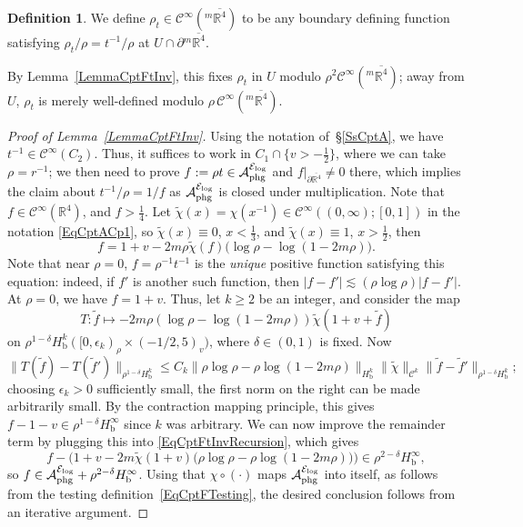 \documentclass[reqno,11pt,letterpaper]{amsart}
\numberwithin{equation}{section}
\numberwithin{figure}{section}
\theoremstyle{definition}
\newtheorem{definition}[thm]{Definition}
\theoremstyle{remark}
\newcommand{\mc}{\mathcal}
\newcommand{\cA}{\mc A}
\newcommand{\cC}{\mc C}
\newcommand{\cE}{\mc E}
\newcommand{\R}{\mathbb{R}}
\newcommand{\eps}{\epsilon}
\newcommand{\ol}{\overline}
\newcommand{\pa}{\partial}
\newcommand{\bop}{{\mathrm{b}}}
\newcommand{\half}{\tfrac{1}{2}}
\newcommand{\CI}{\cC^\infty}
\newcommand{\Hb}{H_{\bop}}
\newcommand{\phg}{{\mathrm{phg}}}
\newcommand{\usref}[1]{{\upshape\ref{#1}}}
\begin{document}
\begin{definition}
\label{DefCptFtInv}
  We define $\rho_t\in\CI({}^m\ol{\R^4})$ to be any boundary defining function satisfying $\rho_t/\rho=t^{-1}/\rho$ at $U\cap\pa{}^m\ol{\R^4}$.
\end{definition}

By Lemma~\ref{LemmaCptFtInv}, this fixes $\rho_t$ in $U$ modulo $\rho^2\CI({}^m\ol{\R^4})$; away from $U$, $\rho_t$ is merely well-defined modulo $\rho\,\CI({}^m\ol{\R^4})$.

\begin{proof}[Proof of Lemma~\usref{LemmaCptFtInv}]
  Using the notation of~\S\ref{SsCptA}, we have $t^{-1}\in\CI(C_2)$. Thus, it suffices to work in $C_1\cap\{v>-\half\}$, where we can take $\rho=r^{-1}$; we then need to prove $f:=\rho t\in\cA_\phg^{\cE_{\rm log}}$ and $f|_{\pa\ol{\R^4}}\neq 0$ there, which implies the claim about $t^{-1}/\rho=1/f$ as $\cA_\phg^{\cE_{\rm log}}$ is closed under multiplication. Note that $f\in\CI(\R^4)$, and $f>\tfrac14$. Let $\tilde\chi(x)=\chi(x^{-1})\in\CI((0,\infty);[0,1])$ in the notation \eqref{EqCptACp1}, so $\tilde\chi(x)\equiv 0$, $x<\tfrac13$, and $\tilde\chi(x)\equiv 1$, $x>\half$, then
  \begin{equation}
  \label{EqCptFtInvRecursion}
    f = 1 + v - 2 m\rho \tilde\chi(f) \bigl(\log\rho-\log(1-2 m\rho)\bigr).
  \end{equation}
  Note that near $\rho=0$, $f=\rho^{-1}t^{-1}$ is the \emph{unique} positive function satisfying this equation: indeed, if $f'$ is another such function, then $|f-f'|\lesssim(\rho\log\rho)|f-f'|$. At $\rho=0$, we have $f=1+v$. Thus, let $k\geq 2$ be an integer, and consider the map
  \[
    T \colon \tilde f \mapsto - 2 m\rho(\log\rho-\log(1-2 m\rho))\tilde\chi(1+v+\tilde f)
  \]
  on $\rho^{1-\delta}\Hb^k([0,\eps_k)_\rho\times(-1/2,5)_v)$, where $\delta\in(0,1)$ is fixed. Now
  \[
    \|T(\tilde f)-T(\tilde f')\|_{\rho^{1-\delta}\Hb^k}\leq C_k\|\rho\log\rho-\rho\log(1-2 m\rho)\|_{\Hb^k} \|\tilde\chi\|_{\cC^k}\|\tilde f-\tilde f'\|_{\rho^{1-\delta}\Hb^k};
  \]
  choosing $\eps_k>0$ sufficiently small, the first norm on the right can be made arbitrarily small. By the contraction mapping principle, this gives $f-1-v\in\rho^{1-\delta}\Hb^\infty$ since $k$ was arbitrary. We can now improve the remainder term by plugging this into \eqref{EqCptFtInvRecursion}, which gives
  \[
    f - \bigl(1 + v - 2 m\tilde\chi(1+v)\bigl(\rho\log\rho-\rho\log(1-2 m\rho)\bigr)\bigr) \in \rho^{2-\delta}\Hb^\infty,
  \]
  so $f\in\cA_\phg^{\cE_{\rm log}}+\rho^{2-\delta}\Hb^\infty$. Using that $\chi\circ(\cdot)$ maps $\cA_\phg^{\cE_{\rm log}}$ into itself, as follows from the testing definition~\eqref{EqCptFTesting}, the desired conclusion follows from an iterative argument.
\end{proof}
\end{document}

